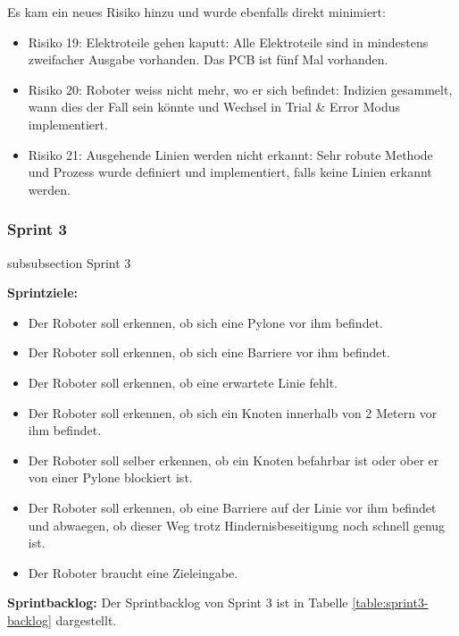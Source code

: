 Es kam ein neues Risiko hinzu und wurde ebenfalls direkt minimiert:
\begin{itemize}
    \item Risiko 19: Elektroteile gehen kaputt: Alle Elektroteile sind in mindestens zweifacher Ausgabe vorhanden. Das PCB ist fünf Mal vorhanden.
    \item Risiko 20: Roboter weiss nicht mehr, wo er sich befindet: Indizien gesammelt, wann dies der Fall sein könnte und Wechsel in Trial \& Error Modus implementiert.
    \item Risiko 21: Ausgehende Linien werden nicht erkannt: Sehr robute Methode und Prozess wurde definiert und implementiert, falls keine Linien erkannt werden.
\end{itemize}
\newpage

\subsubsection*{Sprint 3}
    {subsubsection}
    {Sprint 3}

\textbf{Sprintziele:}
\begin{itemize}
    \item Der Roboter soll erkennen, ob sich eine Pylone vor ihm befindet.
    \item Der Roboter soll erkennen, ob sich eine Barriere vor ihm befindet.
    \item Der Roboter soll erkennen, ob eine erwartete Linie fehlt.
    \item Der Roboter soll erkennen, ob sich ein Knoten innerhalb von 2 Metern vor ihm befindet.
    \item Der Roboter soll selber erkennen, ob ein Knoten befahrbar ist oder ober er von einer Pylone blockiert ist.
    \item Der Roboter soll erkennen, ob eine Barriere auf der Linie vor ihm befindet und abwaegen, ob dieser Weg trotz Hindernisbeseitigung noch schnell genug ist.
    \item Der Roboter braucht eine Zieleingabe.

\end{itemize}

\textbf{Sprintbacklog:} Der Sprintbacklog von Sprint 3 ist in Tabelle 
\ref{table:sprint3-backlog} 
dargestellt.



